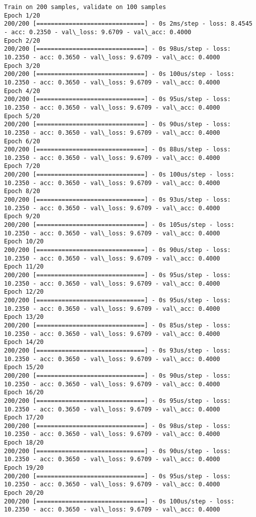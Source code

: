 \documentclass[11pt]{article}
\begin{document}
    \begin{Verbatim}[commandchars=\\\{\}]
Train on 200 samples, validate on 100 samples
Epoch 1/20
200/200 [==============================] - 0s 2ms/step - loss: 8.4545 - acc: 0.2350 - val\_loss: 9.6709 - val\_acc: 0.4000
Epoch 2/20
200/200 [==============================] - 0s 98us/step - loss: 10.2350 - acc: 0.3650 - val\_loss: 9.6709 - val\_acc: 0.4000
Epoch 3/20
200/200 [==============================] - 0s 100us/step - loss: 10.2350 - acc: 0.3650 - val\_loss: 9.6709 - val\_acc: 0.4000
Epoch 4/20
200/200 [==============================] - 0s 95us/step - loss: 10.2350 - acc: 0.3650 - val\_loss: 9.6709 - val\_acc: 0.4000
Epoch 5/20
200/200 [==============================] - 0s 90us/step - loss: 10.2350 - acc: 0.3650 - val\_loss: 9.6709 - val\_acc: 0.4000
Epoch 6/20
200/200 [==============================] - 0s 88us/step - loss: 10.2350 - acc: 0.3650 - val\_loss: 9.6709 - val\_acc: 0.4000
Epoch 7/20
200/200 [==============================] - 0s 100us/step - loss: 10.2350 - acc: 0.3650 - val\_loss: 9.6709 - val\_acc: 0.4000
Epoch 8/20
200/200 [==============================] - 0s 93us/step - loss: 10.2350 - acc: 0.3650 - val\_loss: 9.6709 - val\_acc: 0.4000
Epoch 9/20
200/200 [==============================] - 0s 105us/step - loss: 10.2350 - acc: 0.3650 - val\_loss: 9.6709 - val\_acc: 0.4000
Epoch 10/20
200/200 [==============================] - 0s 90us/step - loss: 10.2350 - acc: 0.3650 - val\_loss: 9.6709 - val\_acc: 0.4000
Epoch 11/20
200/200 [==============================] - 0s 95us/step - loss: 10.2350 - acc: 0.3650 - val\_loss: 9.6709 - val\_acc: 0.4000
Epoch 12/20
200/200 [==============================] - 0s 95us/step - loss: 10.2350 - acc: 0.3650 - val\_loss: 9.6709 - val\_acc: 0.4000
Epoch 13/20
200/200 [==============================] - 0s 85us/step - loss: 10.2350 - acc: 0.3650 - val\_loss: 9.6709 - val\_acc: 0.4000
Epoch 14/20
200/200 [==============================] - 0s 93us/step - loss: 10.2350 - acc: 0.3650 - val\_loss: 9.6709 - val\_acc: 0.4000
Epoch 15/20
200/200 [==============================] - 0s 90us/step - loss: 10.2350 - acc: 0.3650 - val\_loss: 9.6709 - val\_acc: 0.4000
Epoch 16/20
200/200 [==============================] - 0s 95us/step - loss: 10.2350 - acc: 0.3650 - val\_loss: 9.6709 - val\_acc: 0.4000
Epoch 17/20
200/200 [==============================] - 0s 98us/step - loss: 10.2350 - acc: 0.3650 - val\_loss: 9.6709 - val\_acc: 0.4000
Epoch 18/20
200/200 [==============================] - 0s 90us/step - loss: 10.2350 - acc: 0.3650 - val\_loss: 9.6709 - val\_acc: 0.4000
Epoch 19/20
200/200 [==============================] - 0s 95us/step - loss: 10.2350 - acc: 0.3650 - val\_loss: 9.6709 - val\_acc: 0.4000
Epoch 20/20
200/200 [==============================] - 0s 100us/step - loss: 10.2350 - acc: 0.3650 - val\_loss: 9.6709 - val\_acc: 0.4000

    \end{Verbatim}
\end{document}
